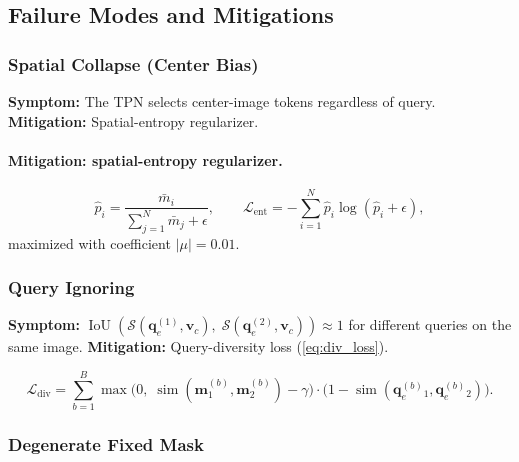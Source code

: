 \documentclass[11pt,a4paper]{article}
\DeclareMathOperator{\IoU}{IoU}
\DeclareMathOperator{\simop}{sim}
\newcommand{\vc}{\mathbf{v}_c}
\newcommand{\qe}{\mathbf{q}_e}
\newcommand{\vm}{\mathbf{m}}
\begin{document}
\subsection{Failure Modes and Mitigations}
\label{subsec:failures}

\subsubsection{Spatial Collapse (Center Bias)}
\label{subsec:spatial_collapse}

\begin{warnbox}[title={Failure Mode 1: Spatial Collapse}]
\textbf{Symptom:} The TPN selects center-image tokens regardless of query.
\textbf{Mitigation:} Spatial-entropy regularizer.
\end{warnbox}

\paragraph{Mitigation: spatial-entropy regularizer.}
\begin{equation}
  \hat{p}_i = \frac{\bar{m}_i}{\sum_{j=1}^N \bar{m}_j + \epsilon},
  \qquad
  \mathcal{L}_{\mathrm{ent}}
    = -\sum_{i=1}^{N} \hat{p}_i \log(\hat{p}_i + \epsilon),
  \label{eq:entropy_reg}
\end{equation}
maximized with coefficient $|\mu|{=}0.01$.

\subsubsection{Query Ignoring}

\begin{warnbox}[title={Failure Mode 2: Query Ignoring}]
\textbf{Symptom:}
$\IoU(\mathcal{S}(\qe^{(1)},\vc),\; \mathcal{S}(\qe^{(2)},\vc)) \approx 1$
for different queries on the same image.
\textbf{Mitigation:} Query-diversity loss (\cref{eq:div_loss}).
\end{warnbox}

\begin{equation}
  \mathcal{L}_{\mathrm{div}} = \sum_{b=1}^{B}
    \max\!\bigl(0,\;\simop(\vm^{(b)}_1,\vm^{(b)}_2) - \gamma\bigr)
    \cdot
    \bigl(1 - \simop(\qe^{(b)}_1, \qe^{(b)}_2)\bigr).
  \label{eq:div_loss}
\end{equation}

\subsubsection{Degenerate Fixed Mask}
\end{document}
